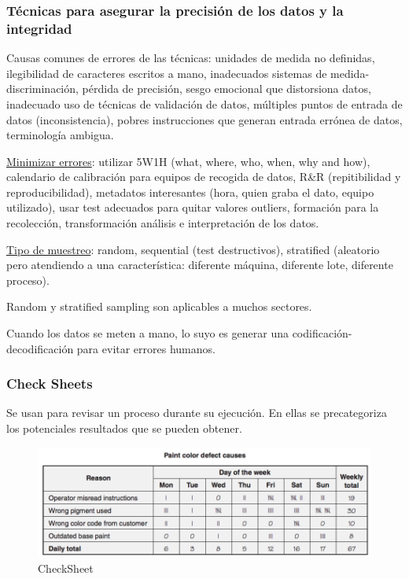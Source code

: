 \documentclass[]{article}
\begin{document}
\subsubsection{Técnicas para asegurar la precisión de los datos y la integridad}

Causas comunes de errores de las técnicas: unidades de medida no definidas, ilegibilidad de caracteres escritos a mano, inadecuados sistemas de medida-discriminación, pérdida de precisión, sesgo emocional que distorsiona datos, inadecuado uso de técnicas de validación de datos, múltiples puntos de entrada de datos (inconsistencia), pobres instrucciones que generan entrada errónea de datos, terminología ambigua.

\underline{Minimizar errores}: utilizar 5W1H (what, where, who, when, why and how), calendario de calibración para equipos de recogida de datos, R\&R (repitibilidad y reproducibilidad), metadatos interesantes (hora, quien graba el dato, equipo utilizado), usar test adecuados para quitar valores outliers, formación para la recolección, transformación análisis e interpretación de los datos.

\underline{Tipo de muestreo}: random, sequential (test destructivos), stratified (aleatorio pero atendiendo a una característica: diferente máquina, diferente lote, diferente proceso).

Random y stratified sampling son aplicables a muchos sectores.

Cuando los datos se meten a mano, lo suyo es generar una codificación-decodificación para evitar errores humanos.

\subsubsection{Check Sheets}

Se usan para revisar un proceso durante su ejecución. En ellas se precategoriza los potenciales resultados que se pueden obtener.

\begin{figure}[ht!]
	\centering
	\includegraphics[width=120mm]{imagenes/CheckSheet.png}
	\caption{CheckSheet}
\end{figure}
\end{document}
